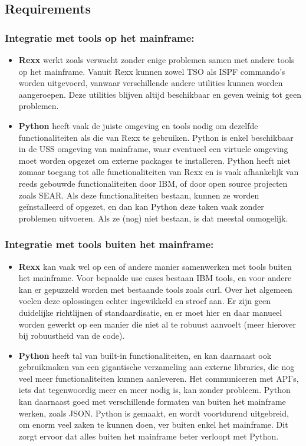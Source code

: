\subsection{Requirements}

\subsubsection{Integratie met tools op het mainframe:}
\begin{itemize}
    \item \textbf{Rexx} werkt zoals verwacht zonder enige problemen samen met andere tools op het mainframe. Vanuit Rexx kunnen zowel TSO als ISPF commando's worden uitgevoerd, vanwaar verschillende andere utilities kunnen worden aangeroepen. Deze utilities blijven altijd beschikbaar en geven weinig tot geen problemen.
    \item \textbf{Python} heeft vaak de juiste omgeving en tools nodig om dezelfde functionaliteiten als die van Rexx te gebruiken. Python is enkel beschikbaar in de USS omgeving van mainframe, waar eventueel een virtuele omgeving moet worden opgezet om externe packages te installeren. Python heeft niet zomaar toegang tot alle functionaliteiten van Rexx en is vaak afhankelijk van reeds gebouwde functionaliteiten door IBM, of door open source projecten zoals SEAR. Als deze functionaliteiten bestaan, kunnen ze worden geïnstalleerd of opgezet, en dan kan Python deze taken vaak zonder problemen uitvoeren. Als ze (nog) niet bestaan, is dat meestal onmogelijk.
\end{itemize}

\subsubsection{Integratie met tools buiten het mainframe:}
\begin{itemize}
    \item \textbf{Rexx} kan vaak wel op een of andere manier samenwerken met tools buiten het mainframe. Voor bepaalde use cases bestaan IBM tools, en voor andere kan er gepuzzeld worden met bestaande tools zoals curl. Over het algemeen voelen deze oplossingen echter ingewikkeld en stroef aan. Er zijn geen duidelijke richtlijnen of standaardisatie, en er moet hier en daar manueel worden gewerkt op een manier die niet al te robuust aanvoelt (meer hierover bij robuustheid van de code).
    \item \textbf{Python} heeft tal van built-in functionaliteiten, en kan daarnaast ook gebruikmaken van een gigantische verzameling aan externe libraries, die nog veel meer functionaliteiten kunnen aanleveren. Het communiceren met API's, iets dat tegenwoordig meer en meer nodig is, kan zonder probleem. Python kan daarnaast goed met verschillende formaten van buiten het mainframe werken, zoals JSON. Python is gemaakt, en wordt voortdurend uitgebreid, om enorm veel zaken te kunnen doen, ver buiten enkel het mainframe. Dit zorgt ervoor dat alles buiten het mainframe beter verloopt met Python.
\end{itemize}

